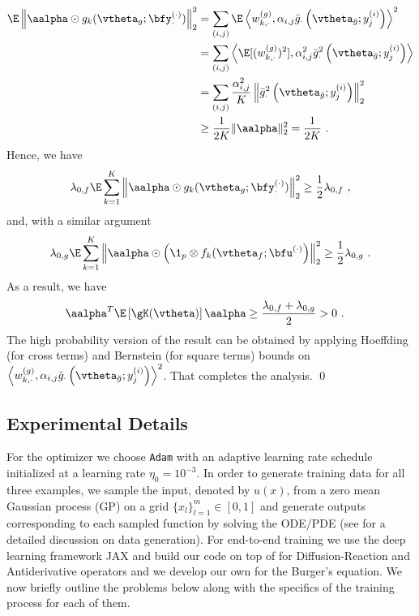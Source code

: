 \begin{align*}
\E \left\| \aalpha \odot g_k(\vtheta_g; \bfy^{(\cdot)}_{\cdot}) \right\|_2^2 & = \sum_{(i,j)} \E \left\langle w_{k,\cdot}^{(g)} , \alpha_{i,j} \bar{g}_{\cdot} \left( \vtheta_{\bar{g}} ; y^{(i)}_j \right) \right\rangle^2 \\
& = \sum_{(i,j)} \left\langle \E[(w_{k,\cdot}^{(g)})^2] , \alpha_{i,j}^2 \bar{g}_{\cdot}^2 \left( \vtheta_{\bar{g}} ; y^{(i)}_j \right) \right\rangle \\
& = \sum_{(i,j)} \frac{\alpha_{i,j}^2}{K} \left\|   \bar{g}_{\cdot}^2 \left( \vtheta_{\bar{g}} ; y^{(i)}_j \right) \right\|_2^2 \\
& \geq \frac{1}{2K} \| \aalpha \|_2^2 = \frac{1}{2K}~.
\end{align*}
Hence, we have
\begin{align*}
 \lambda_{0,f} \E \sum_{k=1}^K \left\| \aalpha \odot g_k(\vtheta_g; \bfy^{(\cdot)}_{\cdot}) \right\|_2^2 \geq \frac{1}{2} \lambda_{0,f}~,
\end{align*}
and, with a similar argument 
\begin{align*}
\lambda_{0,g} \E \sum_{k=1}^K \left\| \aalpha \odot \left(\1_p \otimes f_k(\vtheta_f; \bfu^{(\cdot)} \right) \right\|_2^2 \geq \frac{1}{2} \lambda_{0,g}~.
\end{align*}
As a result, we have
\begin{align}
\aalpha^T \E \left[\gK(\vtheta) \right] \aalpha & \geq \frac{ \lambda_{0,f} + \lambda_{0,g}}{2} > 0~.    
\end{align}
The high probability version of the result can be obtained by applying Hoeffding (for cross terms) and Bernstein (for square terms) bounds on $\left\langle w_{k,\cdot}^{(g)} , \alpha_{i,j} \bar{g}_{\cdot} \left( \vtheta_{\bar{g}} ; y^{(i)}_j \right) \right\rangle^2$. That completes the analysis. \qed




\subsection{Experimental Details}\label{appdx:Experiments}


For the optimizer we choose \texttt{Adam} \citet{kingma2014adam} with an adaptive learning rate schedule initialized at a learning rate $\eta_0=10^{-3}$. %
In order to generate training data for all three examples, we sample the input, denoted by $u(x)$, from a zero mean Gaussian process (GP) on a grid $\{x_l\}_{l=1}^m \in [0, 1]$ and generate outputs corresponding to each sampled function by solving the ODE/PDE (see \citet{wang_learning_2021,lu20201DeepONet} for a detailed discussion on data generation). For end-to-end training we use the deep learning framework JAX \citet{jax2018github} and build our code on top of \citet{wang_learning_2021} for Diffusion-Reaction and Antiderivative operators and we develop our own for the Burger's equation. We now briefly outline the problems below along with the specifics of the training process for each of them.
